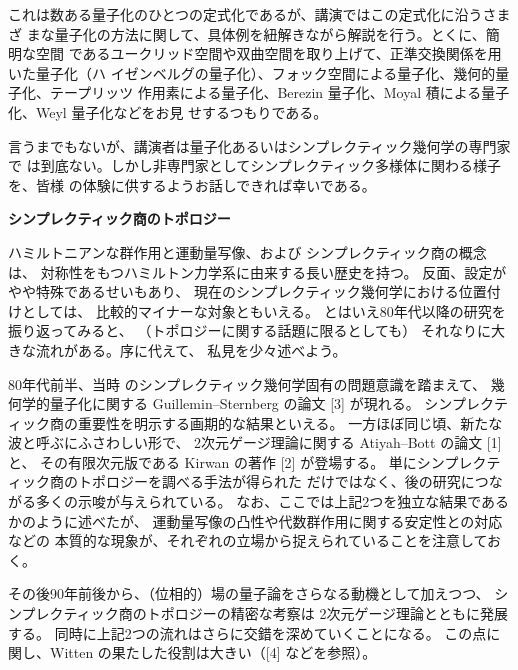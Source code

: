 \documentclass[uplatex,dvipdfmx]{jlreq}
\begin{document}
これは数ある量子化のひとつの定式化であるが、講演ではこの定式化に沿うさまざ
まな量子化の方法に関して、具体例を紐解きながら解説を行う。とくに、簡明な空間
であるユークリッド空間や双曲空間を取り上げて、正準交換関係を用いた量子化（ハ
イゼンベルグの量子化）、フォック空間による量子化、幾何的量子化、テープリッツ
作用素による量子化、Berezin 量子化、Moyal 積による量子化、Weyl 量子化などをお見
せするつもりである。

言うまでもないが、講演者は量子化あるいはシンプレクティック幾何学の専門家で
は到底ない。しかし非専門家としてシンプレクティック多様体に関わる様子を、皆様
の体験に供するようお話しできれば幸いである。

\newpage

\begin{center}
{\large\bfseries シンプレクティック商のトポロジー}\\[6pt]
\hspace*{\fill}{\large\bfseries 高倉　樹（中央大・理工）}
\end{center}
\vspace{1pc}

ハミルトニアンな群作用と運動量写像、および
シンプレクティック商の概念は、
対称性をもつハミルトン力学系に由来する長い歴史を持つ。
反面、設定がやや特殊であるせいもあり、
現在のシンプレクティック幾何学における位置付けとしては、
比較的マイナーな対象ともいえる。
とはいえ80年代以降の研究を振り返ってみると、
（トポロジーに関する話題に限るとしても）
それなりに大きな流れがある。序に代えて、
私見を少々述べよう。

80年代前半、当時
のシンプレクティック幾何学固有の問題意識を踏まえて、
幾何学的量子化に関する Guillemin--Sternberg の論文 [3] が現れる。
シンプレクティック商の重要性を明示する画期的な結果といえる。
一方ほぼ同じ頃、新たな波と呼ぶにふさわしい形で、
2次元ゲージ理論に関する
Atiyah--Bott の論文 [1] と、
その有限次元版である Kirwan の著作 [2] が登場する。
単にシンプレクティック商のトポロジーを調べる手法が得られた
だけではなく、後の研究につながる多くの示唆が与えられている。
なお、ここでは上記2つを独立な結果であるかのように述べたが、
運動量写像の凸性や代数群作用に関する安定性との対応などの
本質的な現象が、それぞれの立場から捉えられていることを注意しておく。

その後90年前後から、（位相的）場の量子論をさらなる動機として加えつつ、
シンプレクティック商のトポロジーの精密な考察は
2次元ゲージ理論とともに発展する。
同時に上記2つの流れはさらに交錯を深めていくことになる。
この点に関し、Witten の果たした役割は大きい（[4] などを参照）。
\vspace{1pc}
\end{document}
